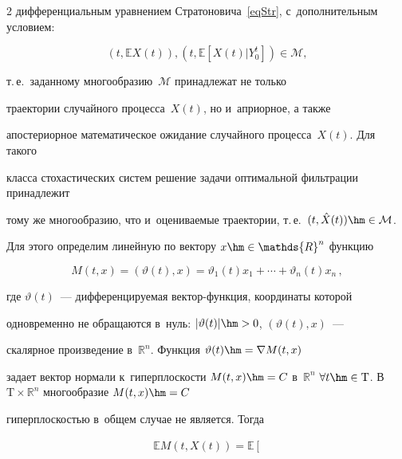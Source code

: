 \begin{multicols}{2}
дифференциальным уравнением Стратоновича~\eqref{eqStr}, с~дополнительным условием:

$$

  (t,\mathbb{E} X(t)), (t,\mathbb{E}[X(t)|Y_0^t]) \in \mathcal{M},

$$

т.\,е.\ заданному многообразию~$\mathcal{M}$ принадлежат не только 

траектории случайного процесса~$X(t)$, но и~априорное, а также 

апостериорное математическое ожидание случайного процесса~$X(t)$. Для такого 

класса стохастических систем решение задачи оптимальной фильтрации принадлежит 

тому же многообразию, что и~оцениваемые траектории, т.\,е.\ $(t,\hat X(t)) \hm\in 

\mathcal{M}$.



Для этого определим линейную по вектору $x \hm\in \mathds{R}^n$ функцию

\begin{equation}

\label{eqDefM}

  M(t,x) = \left( \vartheta(t),x \right) = 

  \vartheta_1(t) x_1 + \cdots + \vartheta_n(t) x_n\,,

\end{equation}

где $\vartheta(t)$~--- дифференцируемая век\-тор-функ\-ция, координаты которой 

одновременно не обращаются в~нуль: $|\vartheta(t)| \hm> 0$, $(\vartheta(t),x)$~--- 

скалярное произведение в~$\mathds{R}^n$. Функция $\vartheta(t) \hm= \nabla M(t,x)$ 

задает вектор нормали к~гиперплоскости $M(t,x) \hm= C$ в~$\mathds{R}^n$ $\forall t 

\hm\in \mathrm{T}$. В~$\mathrm{T} \times \mathds{R}^n$ многообразие $M(t,x) \hm= C$ 

ги\-пер\-плос\-костью в~общем случае не является. Тогда



\vspace*{-6pt}



\noindent

\begin{multline*}

 \! \!\!\mathbb{E} M(t,X(t)) = \mathbb{E} \left[ 


\end{multline*}
\end{multicols}
